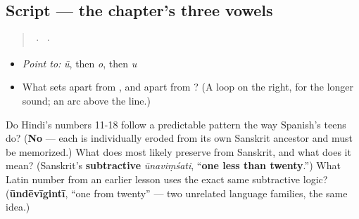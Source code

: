 \subsection*{Script — the chapter's three vowels}
\begin{quote}
  ·    ·  
\end{quote}

\begin{itemize}
\raggedright
  \item \emph{Point to:} \emph{ū}, then \emph{o}, then \emph{u}
  \item What sets \textbf{} apart from \textbf{}, and \textbf{} apart from \textbf{}? (A loop on the right, for the longer sound; an arc above the line.)
\end{itemize}

\begin{tcolorbox}[breakable,colback=teal!4,colframe=teal!35!black,title={Before you move on}]
Do Hindi's numbers 11-18 follow a predictable pattern the way Spanish's teens do? (\textbf{No} — each is individually eroded from its own Sanskrit ancestor and must be memorized.) What does \textbf{} most likely preserve from Sanskrit, and what does it mean? (Sanskrit's \textbf{subtractive} \emph{ūnaviṃśati}, \textquotedblleft{}\textbf{one less than twenty}.\textquotedblright{}) What Latin number from an earlier lesson uses the exact same subtractive logic? (\textbf{ūndēvīgintī}, \textquotedblleft{}one from twenty\textquotedblright{} — two unrelated language families, the same idea.)
\end{tcolorbox}
